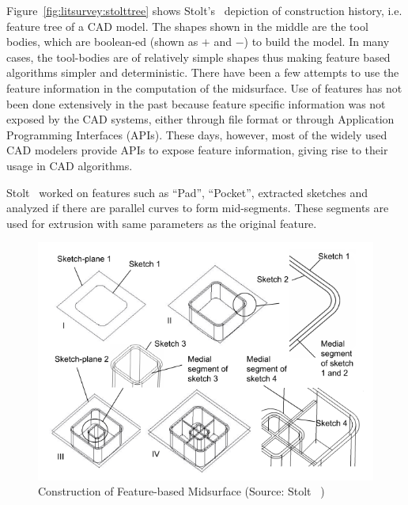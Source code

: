 
Figure~\ref{fig:litsurvey:stolttree} shows Stolt's~\cite{Stolt2006} depiction of construction history, i.e. feature tree of a CAD model. The shapes shown in the middle are the tool bodies, which are boolean-ed (shown as $+$ and $-$) to build the model. In many cases, the tool-bodies are of relatively simple shapes  thus making feature based algorithms simpler and deterministic. There have been a few attempts to use the feature information in the computation of the midsurface. Use of features has not been done extensively in the past because feature specific information was not exposed by the CAD systems, either through file format or through Application Programming Interfaces (APIs). These days, however, most of the widely used CAD modelers provide APIs to expose feature information, giving rise to their usage in CAD algorithms. 


Stolt~\cite{Stolt2005} worked on features such as ``Pad'', ``Pocket'', extracted sketches and analyzed if there are parallel curves to form mid-segments. These segments are used for extrusion with same parameters as the original feature.


	\begin{figure} [!h]
		\centering
		\includegraphics[width=0.75\linewidth]{..//Common/images/stoltmids}
		\caption{Construction of Feature-based Midsurface (Source: Stolt~\cite{Stolt2006} )}
		\label{fig:litsurvey:stoltmids}
	\end{figure}

